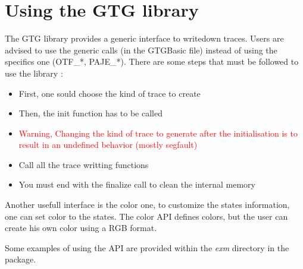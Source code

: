 \section{Using the GTG library}
The GTG library provides a generic interface to writedown traces. Users are 
advised to use the generic calls (in the GTGBasic file) instead of using the
specifics one (OTF\_*, PAJE\_*). There are some steps that must be followed
to use the library :
\begin{itemize}
\item First, one sould choose the kind of trace to create
\item Then, the init function has to be called
\item \textcolor{red}{Warning, Changing the kind of trace to generate after
the initialisation is to result in an undefined behavior (mostly segfault)}
\item Call all the trace writting functions
\item You must end with the finalize call to clean the internal memory
\end{itemize}

Another usefull interface is the color one, to customize the states 
information, one can set color to the states. The color API defines
colors, but the user can create his own color using a RGB format.

Some examples of using the API are provided within the \textit{exm} directory
in the package.
